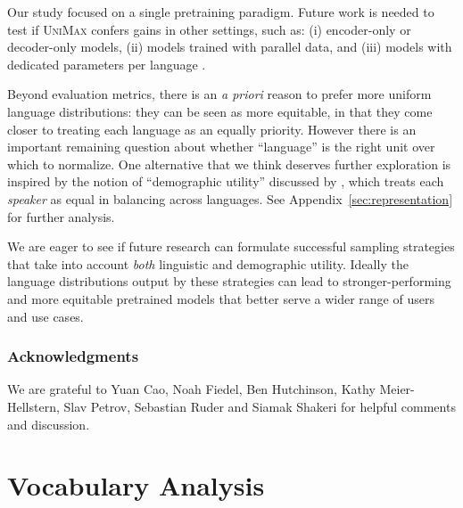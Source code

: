 \documentclass{article} %
\newcommand{\unimax}{\textsc{UniMax}}
\begin{document}
Our study focused on a single pretraining paradigm. Future work is needed to test if \unimax{} confers gains in other settings, such as: (i) encoder-only or decoder-only models, (ii) models trained with parallel data, and (iii) models with dedicated parameters per language \citep{pfeiffer-etal-2022-lifting}.

Beyond evaluation metrics, there is an \textit{a priori} reason to prefer more uniform language distributions: they can be seen as more equitable, in that they come closer to treating each language as an equally priority.  However there is an important remaining question about whether ``language'' is the right unit over which to normalize.  One alternative that we think deserves further exploration is inspired by the notion of ``demographic utility'' discussed by \citet{blasi-etal-2022-systematic}, which treats each \emph{speaker} as equal in balancing across languages. See Appendix~\ref{sec:representation} for further analysis.

We are eager to see if future research can formulate successful sampling strategies that take into account \emph{both} linguistic and demographic utility.  Ideally the language distributions output by these strategies can lead to stronger-performing and more equitable pretrained models that better serve a wider range of users and use cases.

\subsubsection*{Acknowledgments}

We are grateful to Yuan Cao, Noah Fiedel, Ben Hutchinson, Kathy Meier-Hellstern, Slav Petrov, Sebastian Ruder and Siamak Shakeri for helpful comments and discussion.




\appendix

\section{Vocabulary Analysis} \label{sec:vocab_analysis}
\end{document}
